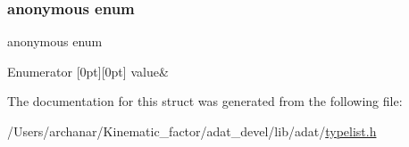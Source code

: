 \subsubsection{\texorpdfstring{anonymous enum}{anonymous enum}}
{\footnotesize\ttfamily anonymous enum}

\begin{DoxyEnumFields}{Enumerator}
[0pt][0pt]{}\mbox{\label{structUtil_1_1TL_1_1Length_3_01NullType_01_4_a042bb471496a540cbcc9a9441edd3b6ea61d625fe199814f6443a5c37c7b429a4}} 
value&\\
\hline

\end{DoxyEnumFields}


The documentation for this struct was generated from the following file\+:\begin{DoxyCompactItemize}
\item 
/\+Users/archanar/\+Kinematic\+\_\+factor/adat\+\_\+devel/lib/adat/\mbox{\hyperlink{lib_2adat_2typelist_8h}{typelist.\+h}}\end{DoxyCompactItemize}
